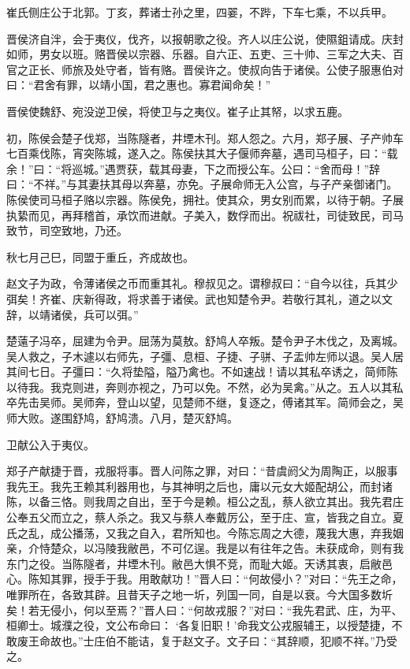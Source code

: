 \documentclass[a4paper,12pt,UTF8,twoside]{ctexbook}
\begin{document}
崔氏侧庄公于北郭。丁亥，葬诸士孙之里，四翣，不跸，下车七乘，不以兵甲。

晋侯济自泮，会于夷仪，伐齐，以报朝歌之役。齐人以庄公说，使隰鉏请成。庆封如师，男女以班。赂晋侯以宗器、乐器。自六正、五吏、三十帅、三军之大夫、百官之正长、师旅及处守者，皆有赂。晋侯许之。使叔向告于诸侯。公使子服惠伯对曰：“君舍有罪，以靖小国，君之惠也。寡君闻命矣！”

晋侯使魏舒、宛没逆卫侯，将使卫与之夷仪。崔子止其帑，以求五鹿。

初，陈侯会楚子伐郑，当陈隧者，井堙木刊。郑人怨之。六月，郑子展、子产帅车七百乘伐陈，宵突陈城，遂入之。陈侯扶其大子偃师奔墓，遇司马桓子，曰：“载余！”曰：“将巡城。”遇贾获，载其母妻，下之而授公车。公曰：“舍而母！”辞曰：“不祥。”与其妻扶其母以奔墓，亦免。子展命师无入公宫，与子产亲御诸门。陈侯使司马桓子赂以宗器。陈侯免，拥社。使其众，男女别而累，以待于朝。子展执絷而见，再拜稽首，承饮而进献。子美入，数俘而出。祝祓社，司徒致民，司马致节，司空致地，乃还。

秋七月己巳，同盟于重丘，齐成故也。

赵文子为政，令薄诸侯之币而重其礼。穆叔见之。谓穆叔曰：“自今以往，兵其少弭矣！齐崔、庆新得政，将求善于诸侯。武也知楚令尹。若敬行其礼，道之以文辞，以靖诸侯，兵可以弭。”

楚薳子冯卒，屈建为令尹。屈荡为莫敖。舒鸠人卒叛。楚令尹子木伐之，及离城。吴人救之，子木遽以右师先，子彊、息桓、子捷、子骈、子盂帅左师以退。吴人居其间七日。子彊曰：“久将垫隘，隘乃禽也。不如速战！请以其私卒诱之，简师陈以待我。我克则进，奔则亦视之，乃可以免。不然，必为吴禽。”从之。五人以其私卒先击吴师。吴师奔，登山以望，见楚师不继，复逐之，傅诸其军。简师会之，吴师大败。遂围舒鸠，舒鸠溃。八月，楚灭舒鸠。

卫献公入于夷仪。

郑子产献捷于晋，戎服将事。晋人问陈之罪，对曰：“昔虞阏父为周陶正，以服事我先王。我先王赖其利器用也，与其神明之后也，庸以元女大姬配胡公，而封诸陈，以备三恪。则我周之自出，至于今是赖。桓公之乱，蔡人欲立其出。我先君庄公奉五父而立之，蔡人杀之。我又与蔡人奉戴厉公，至于庄、宣，皆我之自立。夏氏之乱，成公播荡，又我之自入，君所知也。今陈忘周之大德，蔑我大惠，弃我姻亲，介恃楚众，以冯陵我敝邑，不可亿逞。我是以有往年之告。未获成命，则有我东门之役。当陈隧者，井堙木刊。敝邑大惧不竞，而耻大姬。天诱其衷，启敝邑心。陈知其罪，授手于我。用敢献功！”晋人曰：“何故侵小？”对曰：“先王之命，唯罪所在，各致其辟。且昔天子之地一圻，列国一同，自是以衰。今大国多数圻矣！若无侵小，何以至焉？”晋人曰：“何故戎服？”对曰：“我先君武、庄，为平、桓卿士。城濮之役，文公布命曰： ‘各复旧职！’命我文公戎服辅王，以授楚捷，不敢废王命故也。”士庄伯不能诘，复于赵文子。文子曰：“其辞顺，犯顺不祥。”乃受之。
\end{document}

